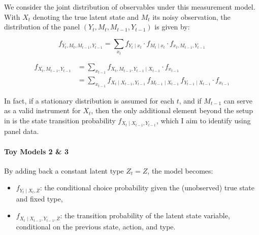 \documentclass[12pt]{article}
\begin{document}
We consider the joint distribution of observables under this measurement model. With $X_t$ denoting the true latent state and $M_t$ its noisy observation, the distribution of the panel $(Y_t, M_t, M_{t-1}, Y_{t-1})$ is given by:

\begin{equation*}
    f_{Y_t, M_t, M_{t-1}, Y_{t-1}} = \sum_{x_t} f_{Y_t \mid x_t} \cdot f_{M_t \mid x_t} \cdot f_{x_t, M_{t-1}, Y_{t-1}}
\end{equation*}


\begin{equation*}
    \begin{split}
        f_{X_t, M_{t-1}, Y_{t-1}} & = \sum_{x_{t-1}} f_{X_t, M_{t-1},Y_{t-1}\mid X_{t-1}}\cdot f_{x_{t-1}} \\
                                  & = \sum_{x_{t-1}}f_{X_t\mid X_{t-1},Y_{t-1}}\,
        f_{M_{t-1}\mid X_{t-1}}\,
        f_{Y_{t-1}\mid X_{t-1}} \cdot f_{x_{t-1}}
    \end{split}
\end{equation*}


In fact, if a stationary distribution is assumed for each $t$, and if $M_{t-1}$ can serve as a valid instrument for $X_t$, then the only additional element beyond the setup in \citet{hu2008identification} is the state transition probability $f_{X_t \mid X_{t-1}, Y_{t-1}}$, which I aim to identify using panel data.


\paragraph{Toy Models 2 \& 3}

By adding back a constant latent type $Z_t = Z$, the model becomes:
\begin{itemize}
    \item $f_{Y_t \mid X_t, Z}$: the conditional choice probability given the (unobserved) true state and fixed type,
    \item $f_{X_t \mid X_{t-1}, Y_{t-1}, Z}$: the transition probability of the latent state variable, conditional on the previous state, action, and type.
\end{itemize}
\end{document}
